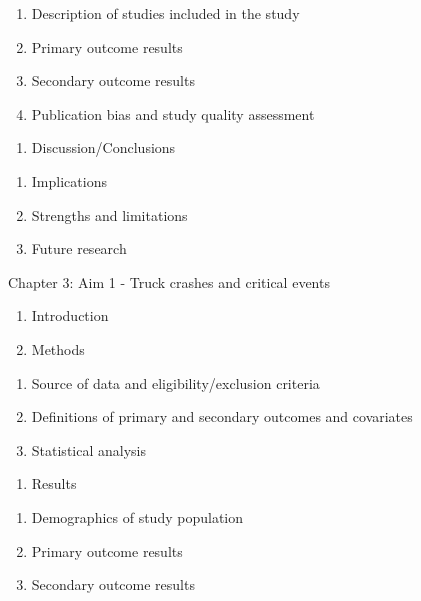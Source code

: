 \documentclass[12pt]{book}
\numberwithin{equation}{chapter}
\providecommand{\tightlist}{%
  \setlength{\itemsep}{0pt}\setlength{\parskip}{0pt}}
\begin{document}
\begin{enumerate}
\def\labelenumi{\arabic{enumi}.}
\tightlist
\item
  Description of studies included in the study
\item
  Primary outcome results
\item
  Secondary outcome results
\item
  Publication bias and study quality assessment
\end{enumerate}

\begin{enumerate}
\def\labelenumi{\Alph{enumi}.}
\setcounter{enumi}{3}
\tightlist
\item
  Discussion/Conclusions
\end{enumerate}

\begin{enumerate}
\def\labelenumi{\arabic{enumi}.}
\tightlist
\item
  Implications
\item
  Strengths and limitations
\item
  Future research
\end{enumerate}

Chapter 3: Aim 1 - Truck crashes and critical events

\begin{enumerate}
\def\labelenumi{\Alph{enumi}.}
\tightlist
\item
  Introduction
\item
  Methods
\end{enumerate}

\begin{enumerate}
\def\labelenumi{\arabic{enumi}.}
\tightlist
\item
  Source of data and eligibility/exclusion criteria
\item
  Definitions of primary and secondary outcomes and covariates
\item
  Statistical analysis
\end{enumerate}

\begin{enumerate}
\def\labelenumi{\Alph{enumi}.}
\setcounter{enumi}{2}
\tightlist
\item
  Results
\end{enumerate}

\begin{enumerate}
\def\labelenumi{\arabic{enumi}.}
\tightlist
\item
  Demographics of study population
\item
  Primary outcome results
\item
  Secondary outcome results
\end{enumerate}
\end{document}

